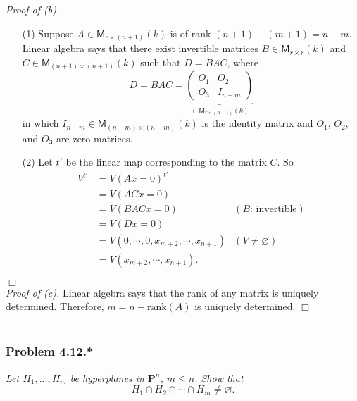 \documentclass{article}
\begin{document}
\emph{Proof of (b).}
\begin{enumerate}
\item[(1)]
  Suppose $A \in \mathsf{M}_{r \times (n+1)}(k)$ is of rank $(n+1) - (m+1) = n-m$.
  Linear algebra says that there exist invertible matrices
  $B \in \mathsf{M}_{r \times r}(k)$ and $C \in \mathsf{M}_{(n+1) \times (n+1)}(k)$
  such that $D = BAC$, where
  \[
    D = BAC =
    \underbrace{\begin{pmatrix}
    O_1 & O_2 \\
    O_3 & I_{n-m}
    \end{pmatrix}}_{\in \mathsf{M}_{r \times (n+1)}(k)}
  \]
  in which $I_{n-m} \in \mathsf{M}_{(n-m) \times (n-m)}(k)$ is the identity matrix
  and $O_1$, $O_2$, and $O_3$ are zero matrices.

\item[(2)]
  Let $t'$ be the linear map corresponding to the matrix $C$.
  So
  \begin{align*}
    V^{t'}
    &= V(Ax = 0)^{t'} \\
    &= V(ACx = 0) \\
    &= V(BACx = 0)
      &(\text{$B$: invertible}) \\
    &= V(Dx = 0) \\
    &= V(0, \cdots, 0, x_{m+2}, \cdots, x_{n+1})
      &(V \neq \varnothing) \\
    &= V(x_{m+2}, \cdots, x_{n+1}).
  \end{align*}
\end{enumerate}
$\Box$ \\



\emph{Proof of (c).}
  Linear algebra says that
  the rank of any matrix is uniquely determined.
  Therefore, $m = n - \mathrm{rank}(A)$ is uniquely determined.
$\Box$ \\\\






\subsubsection*{Problem 4.12.*}
\emph{Let $H_1, \ldots, H_m$ be hyperplanes in $\mathbf{P}^n$, $m \leq n$.
Show that} \\
\[
  H_1 \cap H_2 \cap \cdots \cap H_m \neq \varnothing.
\]
\end{document}
